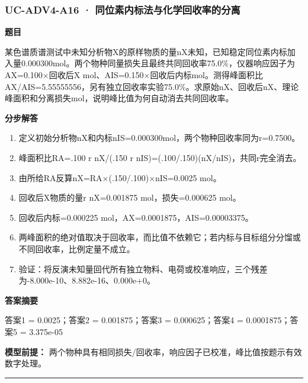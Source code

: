 \documentclass[UTF8,11pt,a4paper]{ctexart}
\begin{document}
\subsubsection*{UC-ADV4-A16 · 同位素内标法与化学回收率的分离}
\noindent\textbf{题目}\par
某色谱质谱测试中未知分析物X的原样物质的量nX未知，已知稳定同位素内标加入量0.000300mol。两个物种同量损失且最终共同回收率75.0\%，仪器响应因子为AX=0.100×回收后X mol、AIS=0.150×回收后内标mol。测得峰面积比AX/AIS=5.55555556，另有独立回收率实验75.0\%。求原始nX、回收后nX、理论峰面积和分离损失mol，说明峰比值为何自动消去共同回收率。\par
\medskip\noindent\textbf{分步解答}
\begin{enumerate}
\item 定义初始分析物nX和内标nIS=0.000300mol，两个物种回收率同为r=0.7500。
\item 峰面积比RA=.100 r nX/(.150 r nIS)=(.100/.150)(nX/nIS)，共同r完全消去。
\item 由所给RA反算nX=RA×(.150/.100)×nIS=0.0025 mol。
\item 回收后X物质的量r nX=0.001875 mol，损失=0.000625 mol。
\item 回收后内标=0.000225 mol，AX=0.0001875，AIS=0.00003375。
\item 两峰面积的绝对值取决于回收率，而比值不依赖它；若内标与目标组分分馏或不同回收率，比例定量不成立。
\item 验证：将反演未知量回代所有独立物料、电荷或校准响应，三个残差为-8.000e-10、8.882e-16、0.000e+0。
\end{enumerate}
\noindent\textbf{答案摘要}\par
答案1 = 0.0025；答案2 = 0.001875；答案3 = 0.000625；答案4 = 0.0001875；答案5 = 3.375e-05\par
\noindent\textbf{模型前提：}
两个物种具有相同损失/回收率，响应因子已校准，峰比值按题示有效数字处理。\par
\medskip\hrule\medskip
{}
\end{document}
